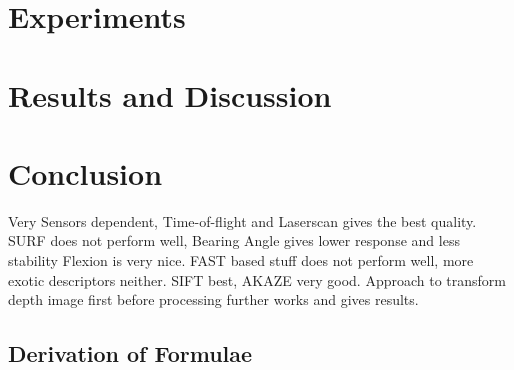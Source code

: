 \documentclass[doktyp=marbeit,fontsize=12pt,sprache=english,hausschrift=true]{TUBAFarbeiten}
\begin{document}
\section{Experiments}





\newpage

\section{Results and Discussion}\label{sec:results}






\newpage

\section{Conclusion}

Very Sensors dependent, Time-of-flight and Laserscan gives the best quality.
SURF does not perform well, Bearing Angle gives lower response and less stability
Flexion is very nice.
FAST based stuff does not perform well, more exotic descriptors neither.
SIFT best, AKAZE very good.
Approach to transform depth image first before processing further works and gives results.


\newpage

\begin{appendix}
    \renewcommand*{\thepage}{\thesection\arabic{page}}
    \renewcommand{\thetable}{\thesection\arabic{table}}
    \renewcommand{\thefigure}{\thesection\arabic{figure}}

    \newpage

    \section{Derivation of Formulae}
    

    \newpage

    
    

    \newpage
    \listoftables

    \newpage
    \listoffigures

    \newpage
\end{appendix}
\end{document}
